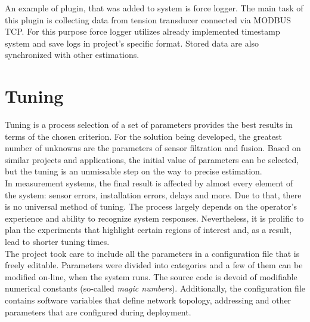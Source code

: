 An example of plugin, that was added to system is force logger. The main task of this plugin is collecting data from tension transducer connected via MODBUS TCP. For this purpose force logger utilizes already implemented timestamp system and save logs in project's specific format. Stored data are also synchronized with other estimations.

\section{Tuning}

Tuning is a process selection of a set of parameters provides the best results in terms of the chosen criterion. For the solution being developed, the greatest number of unknowns are the parameters of sensor filtration and fusion. Based on similar projects and applications, the initial value of parameters can be selected, but the tuning is an unmissable step on the way to precise estimation.\\

In measurement systems, the final result is affected by almost every element of the system: sensor errors, installation errors, delays and more. Due to that, there is no universal method of tuning. The process largely depends on the operator's experience and ability to recognize system responses. Nevertheless, it is prolific to plan the experiments that highlight certain regions of interest and, as a result, lead to shorter tuning times.\\

The project took care to include all the parameters in a configuration file that is freely editable. Parameters were divided into categories and a few of them can be modified on-line, when the system runs. The source code is devoid of modifiable numerical constants (so-called \textit{magic numbers}). Additionally, the configuration file contains software variables that define network topology, addressing and other parameters that are configured during deployment.

